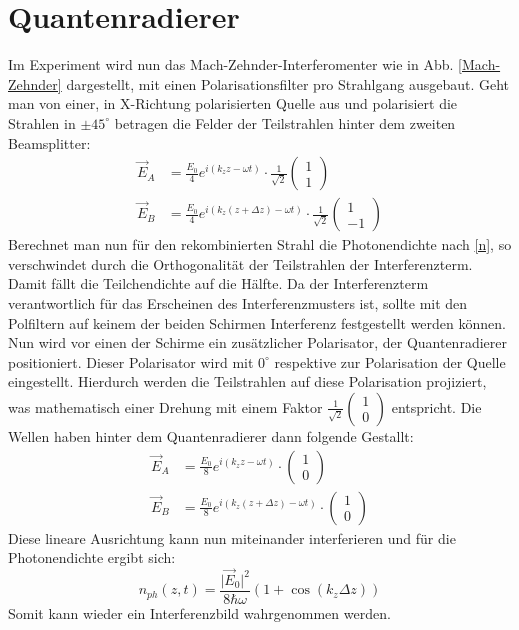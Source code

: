 \documentclass{include/thesisclass3}
\begin{document}
\section{Quantenradierer}
Im Experiment wird nun das Mach-Zehnder-Interferomenter wie in Abb. \ref{Mach-Zehnder} dargestellt, mit einen Polarisationsfilter pro Strahlgang ausgebaut. Geht man von einer, in X-Richtung polarisierten Quelle aus und polarisiert die Strahlen in $\pm 45^\circ$ betragen die Felder der Teilstrahlen hinter dem zweiten Beamsplitter:
\begin{align}
\vec{E}_A&=\frac{E_0}{4}e^{i(k_z z - \omega t)} \cdot\frac{1}{\sqrt{2}}\left(\begin{array}{c} 1 \\ 1 \end{array}\right)\\
\vec{E}_B&=\frac{E_0}{4}e^{i(k_z (z+\Delta z) - \omega t)}\cdot \frac{1}{\sqrt{2}}\left(\begin{array}{c} 1 \\ -1 \end{array}\right)
\end{align}
Berechnet man nun für den rekombinierten Strahl die Photonendichte nach \ref{n}, so verschwindet durch die Orthogonalität der Teilstrahlen der Interferenzterm. Damit fällt die Teilchendichte auf die Hälfte. Da der Interferenzterm verantwortlich für das Erscheinen des Interferenzmusters ist, sollte mit den Polfiltern auf keinem der beiden Schirmen Interferenz festgestellt werden können.\\
Nun wird vor einen der Schirme ein zusätzlicher Polarisator, der Quantenradierer positioniert. Dieser Polarisator wird mit $0^\circ$ respektive zur Polarisation der Quelle eingestellt. Hierdurch werden die Teilstrahlen auf diese Polarisation projiziert, was mathematisch einer Drehung mit einem Faktor $\frac{1}{\sqrt{2}}\left(\begin{array}{c} 1 \\ 0 \end{array}\right)$ entspricht. Die Wellen haben hinter dem Quantenradierer dann folgende Gestallt:
\begin{align}
\vec{E}_A&=\frac{E_0}{8}e^{i(k_z z - \omega t)} \cdot\left(\begin{array}{c} 1 \\ 0 \end{array}\right)\\
\vec{E}_B&=\frac{E_0}{8}e^{i(k_z (z+\Delta z) - \omega t)}\cdot \left(\begin{array}{c} 1 \\ 0 \end{array}\right)
\end{align}
Diese lineare Ausrichtung kann nun miteinander interferieren und für die Photonendichte ergibt sich:
\begin{equation}
n_{ph}(z,t)=\frac{\vert \vec{E}_0\vert ^2}{8\hbar\omega}(1+\cos(k_z\Delta z))
\end{equation}
Somit kann wieder ein Interferenzbild wahrgenommen werden.
\end{document}
